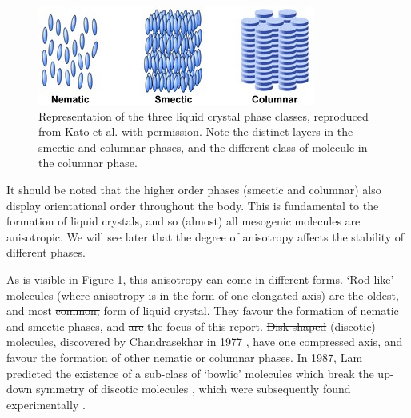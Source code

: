 \documentclass[11pt, a4paper]{article} %
\providecommand{\DIFadd}[1]{{\protect\color{blue}\uwave{#1}}} %
\providecommand{\DIFdel}[1]{{\protect\color{red}\sout{#1}}}                      %
\providecommand{\DIFaddbegin}{} %
\providecommand{\DIFaddend}{} %
\providecommand{\DIFdelbegin}{} %
\providecommand{\DIFdelend}{} %
\begin{document}

\begin{figure} [h!]
	\centering
	\includegraphics[width=0.7\linewidth]{Figures/lc_phases_cropped}
	\caption{Representation of the three liquid crystal phase classes, reproduced from Kato et al. \cite{Kato2007} with permission. Note the distinct layers in the smectic and columnar phases, and the different class of molecule in the columnar phase.}
	\label{fig:lcphasescropped}
\end{figure}


It should be noted that the higher order phases (smectic and columnar) also display orientational order throughout the body. This is fundamental to the formation of liquid crystals, and so (almost) all mesogenic molecules are anisotropic. We will see later that the degree of anisotropy affects the stability of different phases. 

As is visible in Figure \ref{fig:lcphasescropped}, this anisotropy can come in different forms. `Rod-like' molecules (where anisotropy is in the form of one elongated axis) are the oldest, and most \DIFdelbegin \DIFdel{common, }\DIFdelend \DIFaddbegin \DIFadd{\textcolor{forestgreen}{common} }\DIFaddend form of liquid crystal. They favour the formation of nematic and smectic phases, and \DIFdelbegin \DIFdel{are }\DIFdelend \DIFaddbegin \DIFadd{\textcolor{forestgreen}{are} }\DIFaddend the focus of this report. \DIFdelbegin \DIFdel{Disk shaped }\DIFdelend \DIFaddbegin \DIFadd{Disk-shaped }\DIFaddend (discotic) molecules, discovered by Chandrasekhar in 1977 \cite{Chandrasekhar1977}, have one compressed axis, and favour the formation of other nematic or columnar phases. In 1987, Lam predicted the existence of a sub-class of `bowlic' molecules which break the up-down symmetry of discotic molecules \cite{LinLei1988}, which were subsequently found experimentally \cite{Zimmermann1985, Malthete1985}.
\end{document}
